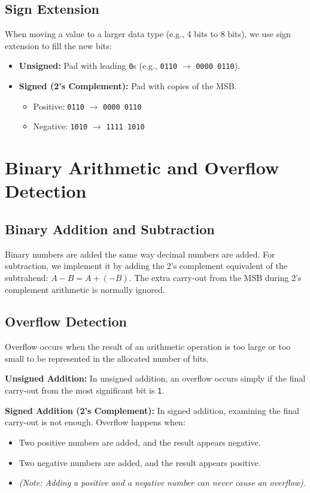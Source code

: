 \subsection{Sign Extension}
When moving a value to a larger data type (e.g., 4 bits to 8 bits), we use sign extension to fill the new bits:
\begin{itemize}
    \item \textbf{Unsigned:} Pad with leading \texttt{0}s (e.g., \texttt{0110} $\rightarrow$ \texttt{0000 0110}).
    \item \textbf{Signed (2's Complement):} Pad with copies of the MSB.
    \begin{itemize}
        \item Positive: \texttt{0110} $\rightarrow$ \texttt{0000 0110}
        \item Negative: \texttt{1010} $\rightarrow$ \texttt{1111 1010}
    \end{itemize}
\end{itemize}

\section{Binary Arithmetic and Overflow Detection}

\subsection{Binary Addition and Subtraction}
Binary numbers are added the same way decimal numbers are added.
For subtraction, we implement it by adding the 2's complement equivalent of the subtrahend: $A - B = A + (-B)$. The extra carry-out from the MSB during 2's complement arithmetic is normally ignored.

\subsection{Overflow Detection}
\begin{definition}[Overflow]
Overflow occurs when the result of an arithmetic operation is too large or too small to be represented in the allocated number of bits.
\end{definition}

\textbf{Unsigned Addition:}
In unsigned addition, an overflow occurs simply if the final carry-out from the most significant bit is \texttt{1}.

\textbf{Signed Addition (2's Complement):}
In signed addition, examining the final carry-out is not enough. Overflow happens when:
\begin{itemize}
    \item Two positive numbers are added, and the result appears negative.
    \item Two negative numbers are added, and the result appears positive.
    \item \textit{(Note: Adding a positive and a negative number can never cause an overflow).}
\end{itemize}

